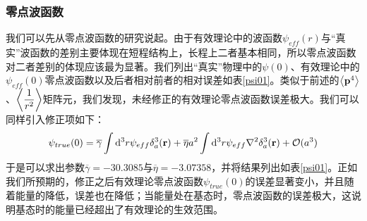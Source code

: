 \documentclass[cs4size,titlepage,twoside]{ctexart}
\begin{document}
\subsubsection{零点波函数}
我们可以先从零点波函数的研究说起。由于有效理论中的波函数$\psi_{eff}(r)$与“真实”波函数的差别主要体现在短程结构上，长程上二者基本相同，所以零点波函数对二者差别的体现应该最为显著。我们列出“真实”物理中的$\psi(0)$、有效理论中的$\psi_{eff}(0)$零点波函数以及后者相对前者的相对误差如表\ref{psi01}。类似于前述的$\expval{\vb{p}^4}$、$\displaystyle\expval{\frac{1}{r^2}}$矩阵元，我们发现，未经修正的有效理论零点波函数误差极大。我们可以同样引入修正项如下：
\begin{equation}\label{psi0}
	\psi_{true}(0)=\overline{\gamma}\int\dd^3r\psi_{eff}\delta^3_a(\vb{r})+\overline{\eta}a^2\int\dd^3r\psi_{eff}\laplacian{\delta^3_a(\vb{r})}+\mathcal{O}(a^3)
\end{equation}
于是可以求出参数$\overline{\gamma}=-30.3085$与$\overline{\eta}=-3.07358$，并将结果列出如表\ref{psi01}。正如我们所预期的，修正之后有效理论零点波函数$\psi_{true}(0)$的误差显著变小，并且随着能量的降低，误差也在降低；当能量处在基态时，零点波函数的误差极大，这说明基态时的能量已经超出了有效理论的生效范围。
\end{document}
